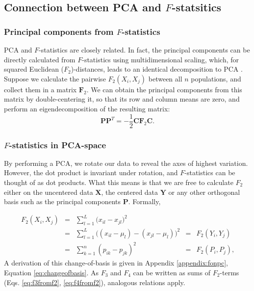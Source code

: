 \documentclass[12pt,fullpage, a4paper]{article}
\newcommand{\MX}{\mathbf{X}} %
\newcommand{\MC}{\mathbf{C}} %
\newcommand{\MY}{\mathbf{Y}} %
\newcommand{\MF}{\mathbf{F}_2} %
\newcommand{\MP}{\mathbf{P}} %
\begin{document}
\subsection{Connection between PCA and $F$-statsitics}	
\subsubsection{Principal components from $F$-statistics}
PCA and $F$-statistics are closely related. In fact, the principal components can be directly calculated from $F$-statistics using multidimensional scaling, which, for squared Euclidean ($F_2$)-distances, leads to an identical decomposition to PCA \citep{gower1966}. Suppose we calculate the pairwise $F_2(X_i, X_j)$ between all $n$ populations, and collect them in a matrix $\MF$. We can obtain the principal components from this matrix by double-centering it, so that its row and column means are zero, and perform an eigendecomposition of the resulting matrix:
\begin{equation}
\MP\MP^T = - \frac{1}{2}\MC\MF\MC \text{.} \label{eq:mds}
\end{equation}

\subsubsection{$F$-statistics in PCA-space}
By performing a PCA, we rotate our data to reveal the axes of highest variation. However, the dot product is invariant under rotation, and $F$-statistics can be thought of as dot products.  What this means is that we are free to calculate $F_2$ either on the uncentered data $\MX$, the centered data $\MY$ or any other orthogonal basis such as the principal components $\MP$. Formally,

\begin{align}
F_2(X_i, X_j) &=&  \sum_{l=1}^L \big( x_{il} -x_{jl}\big)^2  &&\nonumber\\ 
&=& \sum_{l=1}^L \big( (x_{il} - \mu_l) -(x_{jl} -\mu_l)\big)^2   &=& F_2(Y_i, Y_j) \nonumber\\
&=& \sum_{k=1}^n (p_{ik} - p_{jk})^2  &=& F_2(P_i, P_j) \text{,}\label{eq:fpc}
\end{align}
A derivation of this change-of-basis is given in Appendix \ref{appendix:fonpc}, Equation \ref{eq:changeofbasis}.
As $F_3$ and $F_4$ can be written as sums of $F_2$-terms (Eqs. \ref{eq:f3fromf2}, \ref{eq:f4fromf2}), analogous relations apply.
\end{document}
